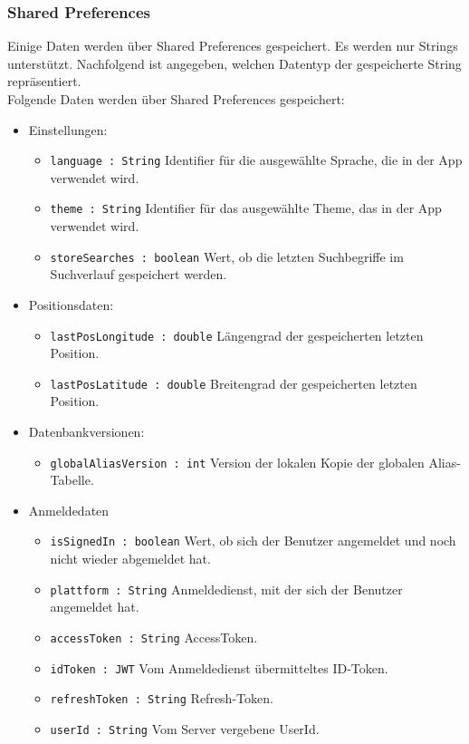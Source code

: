 \subsubsection{Shared Preferences}
Einige Daten werden über Shared Preferences gespeichert. Es werden nur Strings unterstützt. 
Nachfolgend ist angegeben, welchen Datentyp der gespeicherte String repräsentiert.\\
Folgende Daten werden über Shared Preferences gespeichert:

\begin{itemize}
    \item Einstellungen: 
    \begin{itemize}
        \item \texttt{language : String} Identifier für die ausgewählte Sprache, die in der App verwendet wird.
        \item \texttt{theme : String} Identifier für das ausgewählte Theme, das in der App verwendet wird.
        \item \texttt{storeSearches : boolean} Wert, ob die letzten Suchbegriffe im Suchverlauf gespeichert werden.
    \end{itemize}
    \item Positionsdaten:
    \begin{itemize}
        \item \texttt{lastPosLongitude : double} Längengrad der gespeicherten letzten Position.
        \item \texttt{lastPosLatitude : double} Breitengrad der gespeicherten letzten Position.
    \end{itemize}
    \item Datenbankversionen:
    \begin{itemize}
        \item \texttt{globalAliasVersion : int} Version der lokalen Kopie der globalen Alias-Tabelle.
    \end{itemize}
    \item Anmeldedaten
    \begin{itemize}
        \item \texttt{isSignedIn : boolean} Wert, ob sich der Benutzer angemeldet und noch nicht wieder abgemeldet hat.
        \item \texttt{plattform : String} Anmeldedienst, mit der sich der Benutzer angemeldet hat.
        \item \texttt{accessToken : String} AccessToken.
        \item \texttt{idToken : JWT} Vom Anmeldedienst übermitteltes ID-Token.
        \item \texttt{refreshToken : String} Refresh-Token.
        \item \texttt{userId : String} Vom Server vergebene UserId.
    \end{itemize}
\end{itemize}
